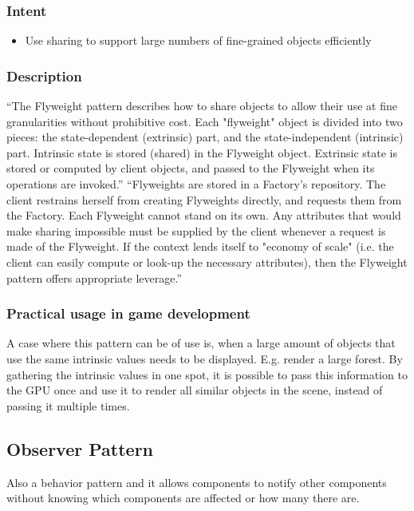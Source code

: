 \subsubsection{Intent}
\begin{itemize} 
\item Use sharing to support large numbers of fine-grained objects efficiently
\end{itemize} 
\citep{Shvets}
\subsubsection{Description}
“The Flyweight pattern describes how to share objects to allow their use at fine granularities without prohibitive cost. Each "flyweight" object is divided into two pieces: the state-dependent (extrinsic) part, and the state-independent (intrinsic) part. Intrinsic state is stored (shared) in the Flyweight object. Extrinsic state is stored or computed by client objects, and passed to the Flyweight when its operations are invoked.”\citep{Shvets}
“Flyweights are stored in a Factory's repository. The client restrains herself from creating Flyweights directly, and requests them from the Factory. Each Flyweight cannot stand on its own. Any attributes that would make sharing impossible must be supplied by the client whenever a request is made of the Flyweight. If the context lends itself to "economy of scale" (i.e. the client can easily compute or look-up the necessary attributes), then the Flyweight pattern offers appropriate leverage.” \citep{Shvets}
\subsubsection{Practical usage in game development}
A case where this pattern can be of use is, when a large amount of objects that use the same intrinsic values needs to be displayed. 
E.g. render a large forest. By gathering the intrinsic values in one spot, it is possible to pass this information to the GPU once and use it to render all similar objects in the scene, instead of passing it multiple times. 

\subsection{Observer Pattern}
Also a behavior pattern and it allows components to notify other components without knowing which components are affected or how many there are. 

